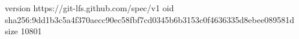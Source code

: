 version https://git-lfs.github.com/spec/v1
oid sha256:9dd1b3c5a4f370aecc90ec58fbf7cd0345b6b3153c0f4636335d8ebee089581d
size 10801
